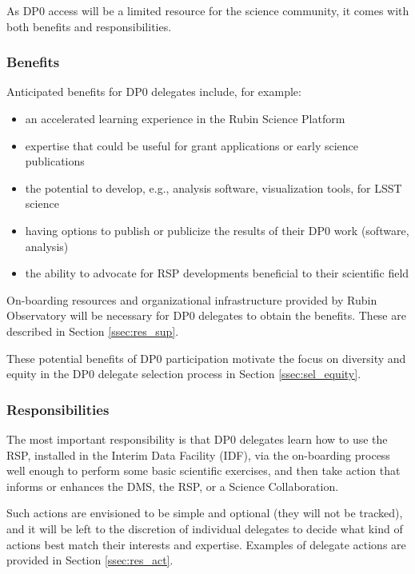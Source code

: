 \documentclass[DM,lsstdraft,authoryear,toc]{lsstdoc}
\begin{document}
As DP0 access will be a limited resource for the science community, it comes with both benefits and responsibilities.

\subsubsection{Benefits}\label{sssec:intro_del_bene}

Anticipated benefits for DP0 delegates include, for example:
\begin{itemize}
\item an accelerated learning experience in the Rubin Science Platform
\item expertise that could be useful for grant applications or early science publications
\item the potential to develop, e.g., analysis software, visualization tools, for LSST science 
\item having options to publish or publicize the results of their DP0 work (software, analysis)
\item the ability to advocate for RSP developments beneficial to their scientific field
\end{itemize}

On-boarding resources and organizational infrastructure provided by Rubin Observatory will be necessary for DP0 delegates to obtain the benefits. These are described in Section \ref{ssec:res_sup}.

These potential benefits of DP0 participation motivate the focus on diversity and equity in the DP0 delegate selection process in Section \ref{ssec:sel_equity}.

\subsubsection{Responsibilities}\label{sssec:intro_del_resp}

The most important responsibility is that DP0 delegates learn how to use the RSP,  installed in the Interim Data Facility (IDF), via the on-boarding process well enough to perform some basic scientific exercises, and then take action that informs or enhances the DMS, the RSP, or a Science Collaboration. 

Such actions are envisioned to be simple and optional (they will not be tracked), and it will be left to the discretion of individual delegates to decide what kind of actions best match their interests and expertise.
Examples of delegate actions are provided in Section \ref{ssec:res_act}.
\end{document}
